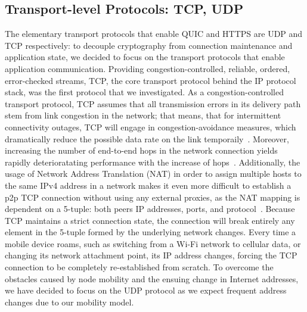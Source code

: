 \subsection{Transport-level Protocols: TCP, UDP}
The elementary transport protocols that enable QUIC and HTTPS are UDP and TCP respectively: to decouple cryptography from connection maintenance and application state, we decided to focus on the transport protocols that enable application communication.
Providing congestion-controlled, reliable, ordered, error-checked streams, TCP, the core transport protocol behind the IP protocol stack, was the first protocol that we investigated.
As a congestion-controlled transport protocol, TCP assumes that all transmission errors in its delivery path stem from link congestion in the network; that means, that for intermittent connectivity outages, TCP will engage in congestion-avoidance measures, which dramatically reduce the possible data rate on the link temporaily~\cite{RFC5681}.
Moreover, increasing the number of end-to-end hops in the network connection yields rapidly deterioratating performance with the increase of hops~\cite{Ott2010}.
Additionally, the usage of Network Address Translation (NAT) in order to assign multiple hosts to the same IPv4 address in a network makes it even more difficult to establish a p2p TCP connection without using any external proxies, as the NAT mapping is dependent on a 5-tuple: both peers IP addresses, ports, and protocol~\cite{Keidar2026}.
Because TCP maintains a strict connection state, the connection will break entirely any element in the 5-tuple formed by the underlying network changes.
Every time a mobile device roams, such as switching from a Wi-Fi network to cellular data, or changing its network attachment point, its IP address changes, forcing the TCP connection to be completely re-established from scratch.
To overcome the obstacles caused by node mobility and the ensuing change in Internet addresses, we have decided to focus on the UDP protocol as we expect frequent address changes due to our mobility model.


